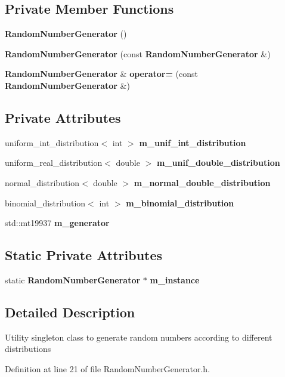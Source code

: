 \subsection*{Private Member Functions}
\begin{DoxyCompactItemize}
\item 
\textbf{ Random\+Number\+Generator} ()
\item 
\textbf{ Random\+Number\+Generator} (const \textbf{ Random\+Number\+Generator} \&)
\item 
\textbf{ Random\+Number\+Generator} \& \textbf{ operator=} (const \textbf{ Random\+Number\+Generator} \&)
\end{DoxyCompactItemize}
\subsection*{Private Attributes}
\begin{DoxyCompactItemize}
\item 
uniform\+\_\+int\+\_\+distribution$<$ int $>$ \textbf{ m\+\_\+unif\+\_\+int\+\_\+distribution}
\item 
uniform\+\_\+real\+\_\+distribution$<$ double $>$ \textbf{ m\+\_\+unif\+\_\+double\+\_\+distribution}
\item 
normal\+\_\+distribution$<$ double $>$ \textbf{ m\+\_\+normal\+\_\+double\+\_\+distribution}
\item 
binomial\+\_\+distribution$<$ int $>$ \textbf{ m\+\_\+binomial\+\_\+distribution}
\item 
std\+::mt19937 \textbf{ m\+\_\+generator}
\end{DoxyCompactItemize}
\subsection*{Static Private Attributes}
\begin{DoxyCompactItemize}
\item 
static \textbf{ Random\+Number\+Generator} $\ast$ \textbf{ m\+\_\+instance}
\end{DoxyCompactItemize}


\subsection{Detailed Description}
Utility singleton class to generate random numbers according to different distributions 

Definition at line 21 of file Random\+Number\+Generator.\+h.



